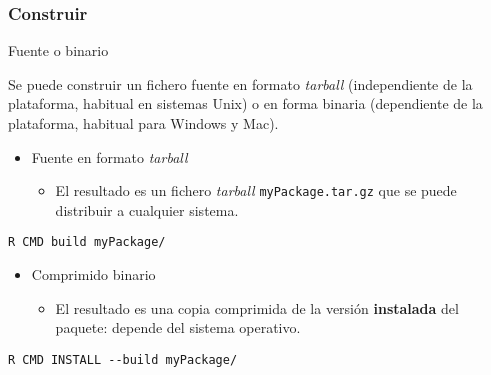 \documentclass[xcolor={usenames,svgnames,dvipsnames}]{beamer}
\begin{document}
\begin{frame}[fragile]
\frametitle{Construir}
\label{sec-3-3}
\begin{block}{Fuente o binario}
\label{sec-3-3-1}

    Se puede construir un fichero fuente en formato \emph{tarball}
    (independiente de la plataforma, habitual en sistemas Unix) o en
    forma binaria (dependiente de la plataforma, habitual para Windows y Mac).
\end{block}
\label{sec-3-3-2}

\begin{itemize}
\item Fuente en formato \emph{tarball}
\begin{itemize}
\item El resultado es un fichero \emph{tarball} \texttt{myPackage.tar.gz} que
     se puede distribuir a cualquier sistema.
\end{itemize}
\end{itemize}

\begin{verbatim}
R CMD build myPackage/
\end{verbatim}
\begin{itemize}
\item Comprimido binario
\begin{itemize}
\item El resultado es una copia comprimida de la versión
     \textbf{instalada} del paquete: depende del sistema operativo.
\end{itemize}
\end{itemize}

\begin{verbatim}
R CMD INSTALL --build myPackage/
\end{verbatim}
\end{frame}
\end{document}
